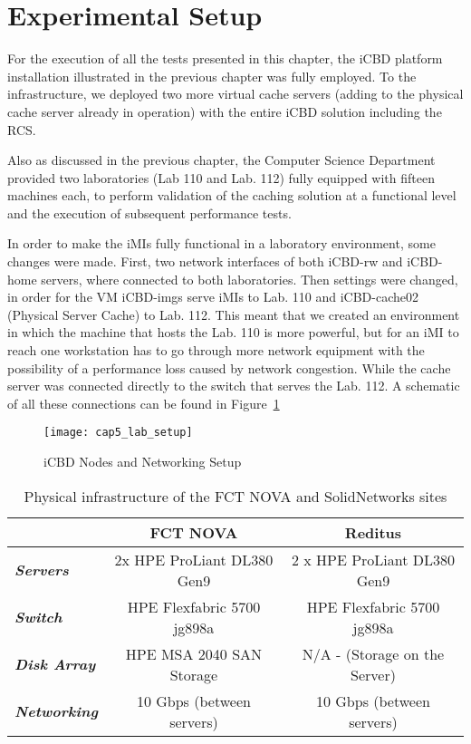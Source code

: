 \section{Experimental Setup}
\label{sec:eval_exp_setup}

For the execution of all the tests presented in this chapter, the iCBD platform installation illustrated in the previous chapter was fully employed. To the infrastructure, we deployed two more virtual cache servers (adding to the physical cache server already in operation) with the entire iCBD solution including the RCS.

Also as discussed in the previous chapter, the Computer Science Department provided two laboratories (Lab 110 and Lab. 112) fully equipped with fifteen machines each, to perform validation of the caching solution at a functional level and the execution of subsequent performance tests.

In order to make the iMIs fully functional in a laboratory environment, some changes were made.
First, two network interfaces of both iCBD-rw and iCBD-home servers, where connected to both laboratories. Then settings were changed, in order for the VM iCBD-imgs serve iMIs to Lab. 110 and iCBD-cache02 (Physical Server Cache) to Lab. 112. 
This meant that we created an environment in which the machine that hosts the Lab. 110 is more powerful, but for an iMI to reach one workstation has to go through more network equipment with the possibility of a performance loss caused by network congestion. While the cache server was connected directly to the switch that serves the Lab. 112. A schematic of all these connections can be found in Figure~\ref{fig:eval_setup}


\begin{figure}[htbp]
	\centering
	\texttt{[image: cap5\_lab\_setup]}
	\caption{iCBD Nodes and Networking Setup}
	\label{fig:eval_setup}
\end{figure}

\begin{table}[htpb]
\centering
\begin{tabular}{lcc}
                             & \textbf{FCT NOVA}          & \textbf{Reditus}              \\ \hline
\textit{\textbf{Servers}}    & 2x HPE ProLiant DL380 Gen9 & 2 x HPE ProLiant DL380 Gen9   \\
\textit{\textbf{Switch}}     & HPE Flexfabric 5700 jg898a & HPE Flexfabric 5700 jg898a    \\
\textit{\textbf{Disk Array}} & HPE MSA 2040 SAN Storage   & N/A - (Storage on the Server) \\
\textit{\textbf{Networking}} & 10 Gbps (between servers)  & 10 Gbps (between servers)     \\ \hline
\end{tabular}
\caption{Physical infrastructure of the FCT NOVA and SolidNetworks sites}
\end{table}


